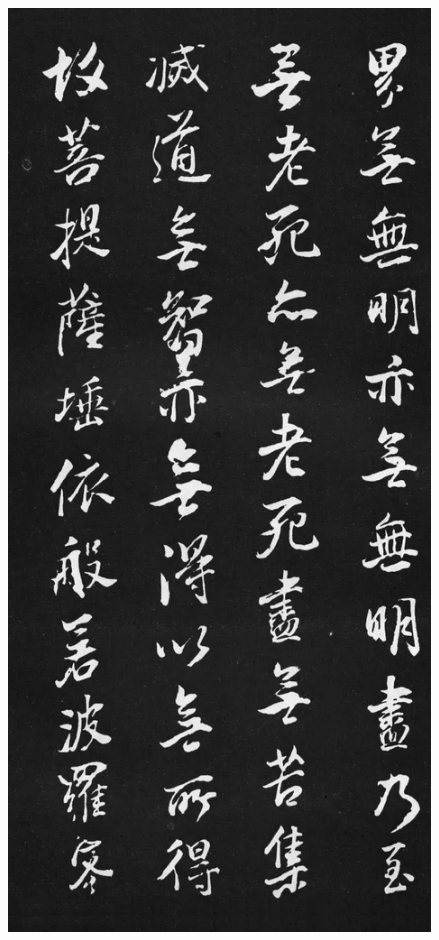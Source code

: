 \documentclass[a4paper,twoside]{article}
\begin{document}
\begin{figure}[ht]
\centering
\includegraphics[width=11.2cm]{images/dongqichang-4}
\end{figure}
\end{document}
